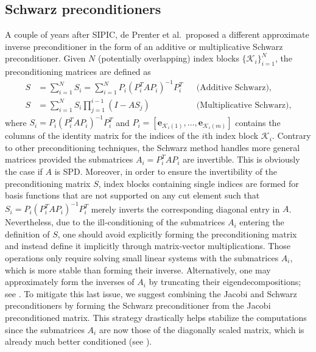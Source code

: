 \documentclass{article}
\numberwithin{equation}{section}
\theoremstyle{definition}
\begin{document}
\subsection{Schwarz preconditioners}
A couple of years after SIPIC, de Prenter et al.\ proposed a different approximate inverse preconditioner in the form of an additive \cite{de2019preconditioning} or multiplicative \cite{de2020multigrid} Schwarz preconditioner. Given $N$ (potentially overlapping) index blocks $\{\mathcal{K}_i\}_{i=1}^N$, the preconditioning matrices are defined as
\begin{align*}
    S &= \sum_{i=1}^N S_i = \sum_{i=1}^N P_i(P_i^TAP_i)^{-1}P_i^T & &\text{(Additive Schwarz)},\\
    S &= \sum_{i=1}^N S_i \prod_{j=1}^{i-1}(I-AS_j) & &\text{(Multiplicative Schwarz)},
\end{align*}
where $S_i=P_i(P_i^TAP_i)^{-1}P_i^T$ and $P_i=[\bm{e}_{\mathcal{K}_i(1)},\dots,\bm{e}_{\mathcal{K}_i(m)}]$ contains the columns of the identity matrix for the indices of the $i$th index block $\mathcal{K}_i$. Contrary to other preconditioning techniques, the Schwarz method handles more general matrices provided the submatrices $A_i=P_i^TAP_i$ are invertible. This is obviously the case if $A$ is SPD. Moreover, in order to ensure the invertibility of the preconditioning matrix $S$, index blocks containing single indices are formed for basis functions that are not supported on any cut element such that $S_i=P_i(P_i^TAP_i)^{-1}P_i^T$ merely inverts the corresponding diagonal entry in $A$. Nevertheless, due to the ill-conditioning of the submatrices $A_i$ entering the definition of $S$, one should avoid explicitly forming the preconditioning matrix and instead define it implicitly through matrix-vector multiplications. Those operations only require solving small linear systems with the submatrices $A_i$, which is more stable than forming their inverse. Alternatively, one may approximately form the inverses of $A_i$ by truncating their eigendecompositions; see \cite{jomo2019robust}. To mitigate this last issue, we suggest combining the Jacobi and Schwarz preconditioners by forming the Schwarz preconditioner from the Jacobi preconditioned matrix. This strategy drastically helps stabilize the computations since the submatrices $A_i$ are now those of the diagonally scaled matrix, which is already much better conditioned (see ).
\end{document}
